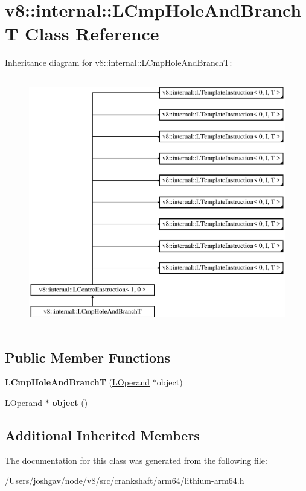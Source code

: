 \hypertarget{classv8_1_1internal_1_1_l_cmp_hole_and_branch_t}{}\section{v8\+:\+:internal\+:\+:L\+Cmp\+Hole\+And\+BranchT Class Reference}
\label{classv8_1_1internal_1_1_l_cmp_hole_and_branch_t}
Inheritance diagram for v8\+:\+:internal\+:\+:L\+Cmp\+Hole\+And\+BranchT\+:\begin{figure}[H]
\begin{center}
\leavevmode
\includegraphics[height=11.000000cm]{classv8_1_1internal_1_1_l_cmp_hole_and_branch_t}
\end{center}
\end{figure}
\subsection*{Public Member Functions}
\begin{DoxyCompactItemize}
\item 
{\bfseries L\+Cmp\+Hole\+And\+BranchT} (\hyperlink{classv8_1_1internal_1_1_l_operand}{L\+Operand} $\ast$object)\hypertarget{classv8_1_1internal_1_1_l_cmp_hole_and_branch_t_a02d55d42c99532f25d58193f05275b91}{}\label{classv8_1_1internal_1_1_l_cmp_hole_and_branch_t_a02d55d42c99532f25d58193f05275b91}

\item 
\hyperlink{classv8_1_1internal_1_1_l_operand}{L\+Operand} $\ast$ {\bfseries object} ()\hypertarget{classv8_1_1internal_1_1_l_cmp_hole_and_branch_t_a6cd260174040d11974b304a147a1e119}{}\label{classv8_1_1internal_1_1_l_cmp_hole_and_branch_t_a6cd260174040d11974b304a147a1e119}

\end{DoxyCompactItemize}
\subsection*{Additional Inherited Members}


The documentation for this class was generated from the following file\+:\begin{DoxyCompactItemize}
\item 
/\+Users/joshgav/node/v8/src/crankshaft/arm64/lithium-\/arm64.\+h\end{DoxyCompactItemize}
